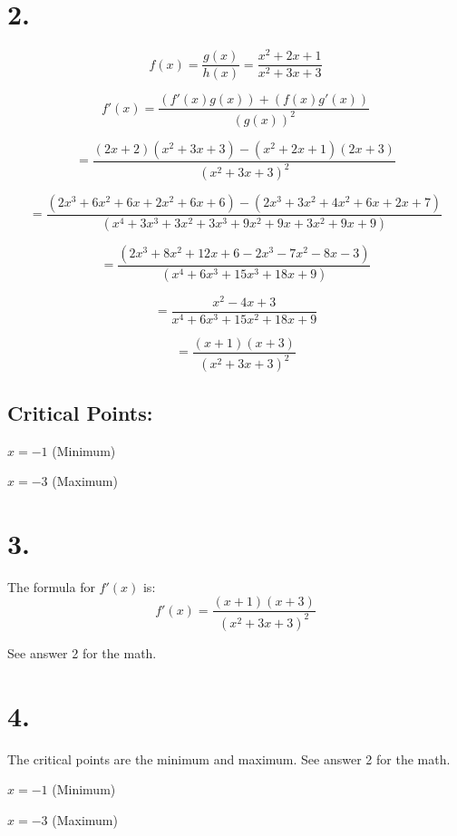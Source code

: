 \begin{solutionbox}{}\newline

\section*{2.}
\[
    f(x) = \frac{g(x)}{h(x)}= \frac{x^2 + 2x + 1}{x^2 + 3x + 3}
\]

\[
    f'(x) = \frac{(f'(x)g(x))+(f(x)g'(x))}{(g(x))^2}
\]

\[
    = \frac{(2x+2)(x^2 + 3x + 3) - (x^2 + 2x + 1)(2x+3)}{(x^2 + 3x + 3)^2}
\]

\[
    = \frac{(2x^3 + 6x^2 + 6x + 2x^2 + 6x + 6)-(2x^3 + 3x^2 + 4x^2 + 6x + 2x + 7)}{(x^4+3x^3 + 3x^2 + 3x^3 + 9x^2 + 9x + 3x^2 + 9x + 9)}
\]

\[
    = \frac{(2x^3 + 8x^2 + 12x + 6 - 2x^3 - 7x^2 - 8x - 3)}{(x^4 + 6x^3 + 15x^3 + 18x + 9)}
\]

\[
    = \frac{x^2 - 4x + 3}{x^4 + 6x^3 + 15x^2 + 18x + 9}
\]

\[
    = \frac{(x+1)(x+3)}{(x^2 + 3x + 3)^2}
\]

\subsection*{Critical Points:}

$x = -1$ (Minimum)

$x = -3$ (Maximum)

\section*{3.}
The formula for $f'(x)$ is:
\[
 f'(x)= \frac{(x+1)(x+3)}{(x^2 + 3x + 3)^2}
\]

See answer 2 for the math.


\section*{4.}

The critical points are the minimum and maximum. See answer 2 for the math.

$x = -1$ (Minimum)

$x = -3$ (Maximum)

\end{solutionbox}
